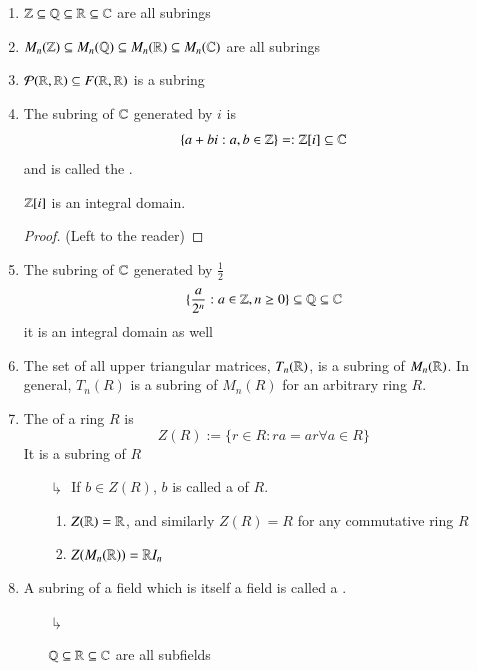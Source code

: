 \documentclass[12pt, a4paper, oneside, openright, titlepage]{book}
\begin{document}
\begin{eg}
    \leavevmode
    \begin{enumerate}
        \item $\mathbb Z\subseteq \mathbb Q\subseteq \mathbb R\subseteq \mathbb C$ are all subrings
        \item $M_n(\mathbb Z) \subseteq M_n(\mathbb Q) \subseteq M_n(\mathbb R) \subseteq M_n(\mathbb C)$ are all subrings
        \item $\mathcal{P}(\mathbb R,\mathbb R) \subseteq F(\mathbb R,\mathbb R)$ is a subring
        \item The subring of $\mathbb C$ generated by $i$ is \begin{equation}
            \{a+bi:a,b \in \mathbb Z\}=:\mathbb Z[i] \subseteq \mathbb C
        \end{equation}
        and is called the .
        \begin{xca}
            $\mathbb Z[i]$ is an integral domain.
            \begin{proof}
                    (Left to the reader)
            \end{proof}
        \end{xca}
        \item The subring of $\mathbb C$ generated by $\frac{1}{2}$ $$\{\frac{a}{2^n}:a \in \mathbb Z, n \geq 0\} \subseteq \mathbb Q \subseteq \mathbb C$$
        it is an integral domain as well
        \item The set of all upper triangular matrices, $T_n(\mathbb R)$, is a subring of $M_n(\mathbb R)$. In general, $T_n(R)$ is a subring of $M_n(R)$ for an arbitrary ring $R$.
        \item The  of a ring $R$ is \begin{equation}
            Z(R):= \{r \in R:ra =ar\forall a \in R\}
        \end{equation}
        It is a subring of $R$
        \begin{enumerate}
            \item[$\drsh$] If $b \in Z(R)$, $b$ is called a  of $R$.
            \begin{eg}
                \begin{enumerate}
                    \item $Z(\mathbb R) = \mathbb R$, and similarly $Z(R) = R$ for any commutative ring $R$
                    \item $Z(M_n(\mathbb R)) = \mathbb R I_n$
                \end{enumerate}
            \end{eg}
        \end{enumerate}
        \item A subring of a field which is itself a field is called a .
        \begin{enumerate}
            \item[$\drsh$] \begin{eg}
                $\mathbb Q\subseteq \mathbb R \subseteq \mathbb C$ are all subfields
            \end{eg} 
        \end{enumerate}
    \end{enumerate}
\end{eg}
\end{document}
